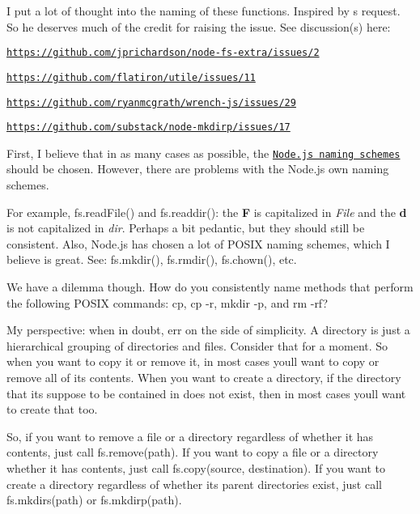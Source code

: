 I put a lot of thought into the naming of these functions. Inspired by \textquotesingle{}s request. So he deserves much of the credit for raising the issue. See discussion(s) here\+:


\begin{DoxyItemize}
\item \href{https://github.com/jprichardson/node-fs-extra/issues/2}{\tt https\+://github.\+com/jprichardson/node-\/fs-\/extra/issues/2}
\item \href{https://github.com/flatiron/utile/issues/11}{\tt https\+://github.\+com/flatiron/utile/issues/11}
\item \href{https://github.com/ryanmcgrath/wrench-js/issues/29}{\tt https\+://github.\+com/ryanmcgrath/wrench-\/js/issues/29}
\item \href{https://github.com/substack/node-mkdirp/issues/17}{\tt https\+://github.\+com/substack/node-\/mkdirp/issues/17}
\end{DoxyItemize}

First, I believe that in as many cases as possible, the \href{http://nodejs.org/api/fs.html}{\tt Node.\+js naming schemes} should be chosen. However, there are problems with the Node.\+js own naming schemes.

For example, {\ttfamily fs.\+read\+File()} and {\ttfamily fs.\+readdir()}\+: the {\bfseries F} is capitalized in {\itshape File} and the {\bfseries d} is not capitalized in {\itshape dir}. Perhaps a bit pedantic, but they should still be consistent. Also, Node.\+js has chosen a lot of P\+O\+S\+IX naming schemes, which I believe is great. See\+: {\ttfamily fs.\+mkdir()}, {\ttfamily fs.\+rmdir()}, {\ttfamily fs.\+chown()}, etc.

We have a dilemma though. How do you consistently name methods that perform the following P\+O\+S\+IX commands\+: {\ttfamily cp}, {\ttfamily cp -\/r}, {\ttfamily mkdir -\/p}, and {\ttfamily rm -\/rf}?

My perspective\+: when in doubt, err on the side of simplicity. A directory is just a hierarchical grouping of directories and files. Consider that for a moment. So when you want to copy it or remove it, in most cases you\textquotesingle{}ll want to copy or remove all of its contents. When you want to create a directory, if the directory that it\textquotesingle{}s suppose to be contained in does not exist, then in most cases you\textquotesingle{}ll want to create that too.

So, if you want to remove a file or a directory regardless of whether it has contents, just call {\ttfamily fs.\+remove(path)}. If you want to copy a file or a directory whether it has contents, just call {\ttfamily fs.\+copy(source, destination)}. If you want to create a directory regardless of whether its parent directories exist, just call {\ttfamily fs.\+mkdirs(path)} or {\ttfamily fs.\+mkdirp(path)}.

